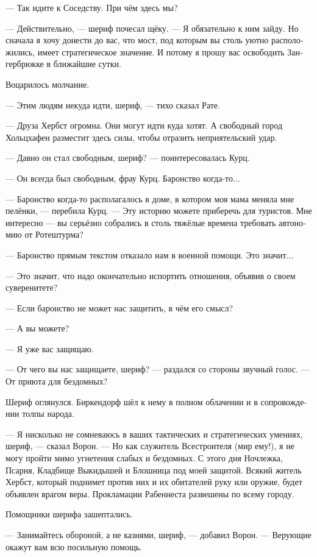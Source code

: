 \documentclass[a4paper,12pt,fleqn]{book}\usepackage{cooltooltips}\usepackage{polyglossia}\setdefaultlanguage[babelshorthands=true]{russian}\setotherlanguage{english}\defaultfontfeatures{Ligatures=TeX,Mapping=tex-text} \usepackage{xcolor}\definecolor{lightgray}{HTML}{bbbbbb}\color{lightgray}\newcommand{\ml}[3]{\textenglish{\textcolor{black}{#3}}}
\begin{document}
--- Так идите к Соседству.
При чём здесь мы?

--- Действительно, --- шериф почесал щёку.
--- Я обязательно к ним зайду.
Но сначала я хочу донести до вас, что мост, под которым вы столь уютно расположились, имеет стратегическое значение.
И потому я прошу вас освободить Зангербрюкке в ближайшие сутки.

Воцарилось молчание.

--- Этим людям некуда идти, шериф, --- тихо сказал Рате.

--- Друза Хербст огромна.
Они могут идти куда хотят.
А свободный город Хольцхафен разместит здесь силы, чтобы отразить неприятельский удар.

--- Давно он стал свободным, шериф? --- поинтересовалась Курц.

--- Он всегда был свободным, фрау Курц.
Баронство когда-то...

--- Баронство когда-то располагалось в доме, в котором моя мама меняла мне пелёнки, --- перебила Курц.
--- Эту историю можете приберечь для туристов.
Мне интересно --- вы серьёзно собрались в столь тяжёлые времена требовать автономию от Ротештурма?

--- Баронство прямым текстом отказало нам в военной помощи.
Это значит...

--- Это значит, что надо окончательно испортить отношения, объявив о своем суверенитете?

--- Если баронство не может нас защитить, в чём его смысл?

--- А вы можете?

--- Я уже вас защищаю.

--- От чего вы нас защищаете, шериф? --- раздался со стороны звучный голос.
--- От приюта для бездомных?

Шериф оглянулся.
Биркендорф шёл к нему в полном облачении и в сопровождении толпы народа.

--- Я нисколько не сомневаюсь в ваших тактических и стратегических умениях, шериф, --- сказал Ворон.
--- Но как служитель Всестроителя (мир ему!), я не могу пройти мимо угнетения слабых и бездомных.
С этого дня Ночлежка, Псарня, Кладбище Выкидышей и Блошница под моей защитой.
Всякий житель Хербст, который поднимет против них и их обитателей руку или оружие, будет объявлен врагом веры.
Прокламации Рабеннеста развешены по всему городу.

Помощники шерифа зашептались.

--- Занимайтесь обороной, а не казнями, шериф, --- добавил Ворон.
--- Верующие окажут вам всю посильную помощь.
\end{document}
